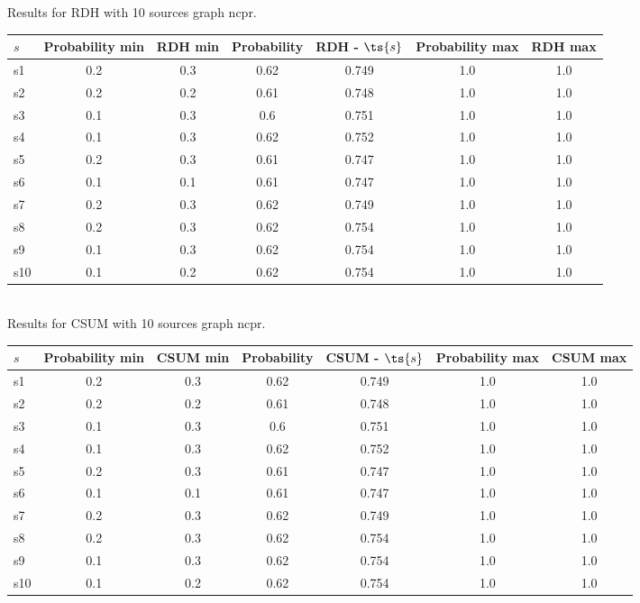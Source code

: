 \documentclass{article}
\begin{document}
\noindent Results for RDH with 10 sources graph ncpr.

\noindent\begin{tabular}{|l|c|c|c|c|c|c|}
\hline
$s$& Probability min & RDH min & Probability & RDH - $\ts{s}$ & Probability max & RDH max\\
\hline
s1 &0.2 & 0.3 & 0.62 & 0.749 & 1.0 & 1.0\\
\hline
s2 &0.2 & 0.2 & 0.61 & 0.748 & 1.0 & 1.0\\
\hline
s3 &0.1 & 0.3 & 0.6 & 0.751 & 1.0 & 1.0\\
\hline
s4 &0.1 & 0.3 & 0.62 & 0.752 & 1.0 & 1.0\\
\hline
s5 &0.2 & 0.3 & 0.61 & 0.747 & 1.0 & 1.0\\
\hline
s6 &0.1 & 0.1 & 0.61 & 0.747 & 1.0 & 1.0\\
\hline
s7 &0.2 & 0.3 & 0.62 & 0.749 & 1.0 & 1.0\\
\hline
s8 &0.2 & 0.3 & 0.62 & 0.754 & 1.0 & 1.0\\
\hline
s9 &0.1 & 0.3 & 0.62 & 0.754 & 1.0 & 1.0\\
\hline
s10 &0.1 & 0.2 & 0.62 & 0.754 & 1.0 & 1.0\\
\hline
\end{tabular}\\

\noindent Results for CSUM with 10 sources graph ncpr.

\noindent\begin{tabular}{|l|c|c|c|c|c|c|}
\hline
$s$& Probability min & CSUM min & Probability & CSUM - $\ts{s}$ & Probability max & CSUM max\\
\hline
s1 &0.2 & 0.3 & 0.62 & 0.749 & 1.0 & 1.0\\
\hline
s2 &0.2 & 0.2 & 0.61 & 0.748 & 1.0 & 1.0\\
\hline
s3 &0.1 & 0.3 & 0.6 & 0.751 & 1.0 & 1.0\\
\hline
s4 &0.1 & 0.3 & 0.62 & 0.752 & 1.0 & 1.0\\
\hline
s5 &0.2 & 0.3 & 0.61 & 0.747 & 1.0 & 1.0\\
\hline
s6 &0.1 & 0.1 & 0.61 & 0.747 & 1.0 & 1.0\\
\hline
s7 &0.2 & 0.3 & 0.62 & 0.749 & 1.0 & 1.0\\
\hline
s8 &0.2 & 0.3 & 0.62 & 0.754 & 1.0 & 1.0\\
\hline
s9 &0.1 & 0.3 & 0.62 & 0.754 & 1.0 & 1.0\\
\hline
s10 &0.1 & 0.2 & 0.62 & 0.754 & 1.0 & 1.0\\
\hline
\end{tabular}\\
\end{document}
